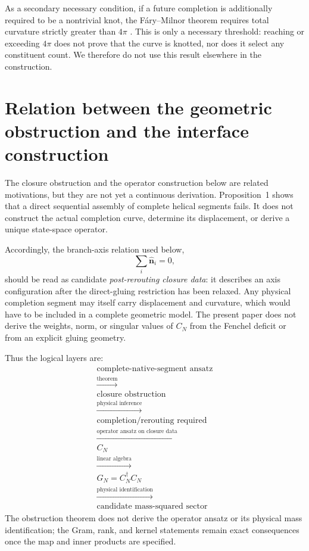 \documentclass[10pt]{article}
\begin{document}
As a secondary necessary condition, if a future completion is additionally required to be a nontrivial knot, the F\'ary--Milnor theorem requires total curvature strictly greater than $4\pi$ \cite{Milnor1950}. This is only a necessary threshold: reaching or exceeding $4\pi$ does not prove that the curve is knotted, nor does it select any constituent count. We therefore do not use this result elsewhere in the construction.

\section{Relation between the geometric obstruction and the interface construction}
\label{sec:relation}

The closure obstruction and the operator construction below are related motivations, but they are not yet a continuous derivation. Proposition~1 shows that a direct sequential assembly of complete helical segments fails. It does not construct the actual completion curve, determine its displacement, or derive a unique state-space operator.

Accordingly, the branch-axis relation used below,
\begin{equation}
\sum_i\hat{\bm n}_i=0,
\end{equation}
should be read as candidate \emph{post-rerouting closure data}: it describes an axis configuration after the direct-gluing restriction has been relaxed. Any physical completion segment may itself carry displacement and curvature, which would have to be included in a complete geometric model. The present paper does not derive the weights, norm, or singular values of $C_N$ from the Fenchel deficit or from an explicit gluing geometry.

Thus the logical layers are:
\begin{equation}
\begin{gathered}
\text{complete-native-segment ansatz}\\
\xrightarrow{\text{theorem}}\\
\text{closure obstruction}\\[0.15em]
\xrightarrow{\text{physical inference}}\\
\text{completion/rerouting required}\\[0.15em]
\xrightarrow{\text{operator ansatz on closure data}}\\
C_N\\
\xrightarrow{\text{linear algebra}}\\
G_N=C_N^\dagger C_N\\[0.15em]
\xrightarrow{\text{physical identification}}\\
\text{candidate mass-squared sector}
\end{gathered}
\label{eq:logicalLayers}
\end{equation}
The obstruction theorem does not derive the operator ansatz or its physical mass identification; the Gram, rank, and kernel statements remain exact consequences once the map and inner products are specified.
\end{document}
